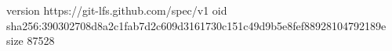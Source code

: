 version https://git-lfs.github.com/spec/v1
oid sha256:390302708d8a2c1fab7d2c609d3161730c151c49d9b5e8fef88928104792189e
size 87528
